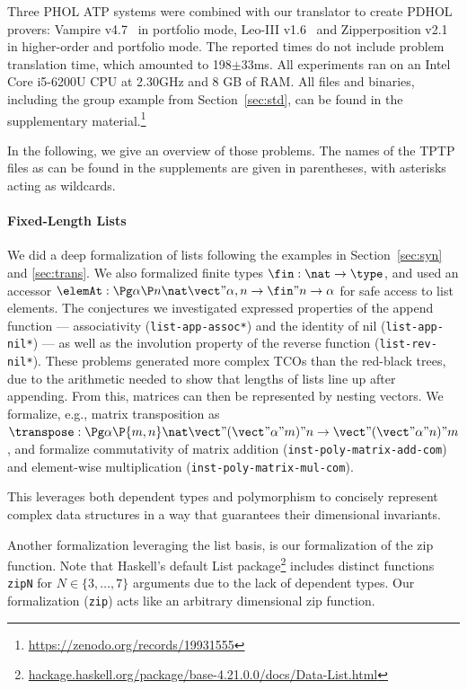 Three PHOL ATP systems were combined with our translator to create PDHOL provers: Vampire
v4.7~\cite{vampire} in portfolio mode, Leo-III v1.6~\cite{leo3_modern} and Zipperposition
v2.1~\cite{C15} in higher-order and portfolio mode.
The reported times do not include problem translation time, which amounted to
198\(\pm\)33ms.
All experiments ran on an Intel Core i5-6200U CPU at 2.30GHz and 8 GB of RAM.
All files and binaries, including the group example from Section~\ref{sec:std}, can be
found in the supplementary material.\footnote{\url{https://zenodo.org/records/19931555}}

In the following, we give an overview of those problems. The names of the TPTP files as can be
found in the supplements are given in parentheses, with asterisks acting as wildcards.

\paragraph*{Fixed-Length Lists}
We did a deep formalization of lists following the examples in Section~\ref{sec:syn} and \ref{sec:trans}.
We also formalized finite types $\fin:\nat\to\type$, and used an accessor $\elemAt:\Pg\alpha\P n\nat\vect"{\alpha,n}\to\fin"n\to\alpha$ for safe access to list elements.
The conjectures we investigated expressed properties of the 
append function --- associativity (\texttt{list-app-assoc*}) and the identity of nil
(\texttt{list-app-nil*}) --- as well as the  
involution property of the reverse function (\texttt{list-rev-nil*}). 
These problems generated more complex TCOs than the red-black trees, due to the arithmetic
needed to show that 
lengths of lists line up after appending.
From this, matrices can then be represented by nesting vectors.
We formalize, e.g., matrix transposition as $\transpose:\Pg\alpha\P {m,n}\nat
\vect"{(\vect"\alpha"m)}"n\to\vect"{(\vect"\alpha"n)}"m$, and formalize commutativity of matrix
addition (\texttt{inst-poly-matrix-add-com}) and element-wise multiplication
(\texttt{inst-poly-matrix-mul-com}).

This leverages both dependent types and polymorphism to concisely represent complex data
structures in a way that guarantees their dimensional invariants.

Another formalization leveraging the list basis, is our formalization of the zip function.
Note that Haskell's default List
package\footnote{\href{https://hackage.haskell.org/package/base-4.21.0.0/docs/Data-List.html\#v:zip3}{hackage.haskell.org/package/base-4.21.0.0/docs/Data-List.html}}
includes distinct functions \texttt{zipN} for \(N \in \{3,\ldots,7\}\) arguments due to the lack
of dependent types. Our formalization (\texttt{zip}) acts like an arbitrary dimensional zip
function.

